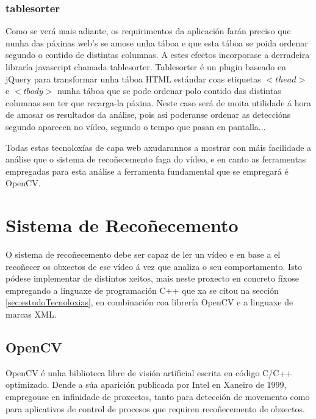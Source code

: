         \subsubsection{tablesorter}
        
            Como se verá mais adiante, os requirimentos da aplicación farán preciso que nunha das
            páxinas web's se amose unha táboa e que esta táboa se poida ordenar segundo o contido de
            distintas columnas. A estes efectos incorporase a derradeira libraría javascript chamada
            tablesorter\cite{tablesorter-webPage}. Tablesorter é un plugin baseado en jQuery para transformar 
            unha táboa HTML estándar coas etiquetas $<thead>$ e $<tbody>$ nunha táboa que se pode 
            ordenar polo contido das distintas columnas sen ter que recarga-la páxina. Neste
            caso será de moita utilidade á hora de amosar os resultados da análise, pois así 
            poderanse ordenar as deteccións segundo aparecen no vídeo, segundo o tempo que pasan 
            en pantalla... 
        
    Todas estas tecnoloxías de capa web axudarannos a mostrar con máis facilidade a análise que o
    sistema de recoñecemento faga do vídeo, e en canto as ferramentas empregadas para esta análise
    a ferramenta fundamental que se empregará é OpenCV.
    
\section{Sistema de Recoñecemento}
    O sistema de recoñecemento debe ser capaz de ler un vídeo e en base a el recoñecer os obxectos
    de ese vídeo á vez que analiza o seu comportamento. Isto pódese implementar de distintos xeitos,
    mais neste proxecto en concreto fíxose empregando a linguaxe de programación C++ que xa se citou
    na sección \ref{sec:estudoTecnoloxias}, en combinación coa librería OpenCV e a linguaxe de marcas
    XML.

\subsection{OpenCV}
    
    OpenCV é unha biblioteca libre de visión artificial escrita en código C/C++ optimizado.
    Dende a súa aparición publicada por Intel en Xaneiro de 1999, empregouse en infinidade 
    de proxectos, tanto para detección de movemento como para aplicativos de control de procesos
    que requiren recoñecemento de obxectos.
    
